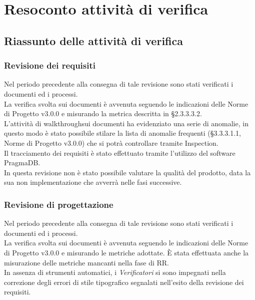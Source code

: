 \section{Resoconto attività di verifica}

\subsection{Riassunto delle attività di verifica}

	\subsubsection{Revisione dei requisiti}
	
	Nel periodo precedente alla consegna di tale revisione sono stati verificati i documenti ed i processi. \\
	La verifica svolta sui documenti è avvenuta seguendo le indicazioni delle Norme di Progetto v3.0.0 e misurando la metrica descritta in §2.3.3.3.2. \\
	L'attività di walkthrough\glosp sui documenti ha evidenziato una serie di anomalie, in questo modo è stato possibile stilare la lista di anomalie frequenti (§3.3.3.1.1, Norme di Progetto v3.0.0) che si potrà controllare tramite Inspection\glosp. \\
	Il tracciamento dei requisiti è stato effettuato tramite l'utilizzo del software PragmaDB. \\
	In questa revisione non è stato possibile valutare la qualità del prodotto, data la sua non implementazione che avverrà nelle fasi successive.
	
	\subsubsection{Revisione di progettazione}
	
	Nel periodo precedente alla consegna di tale revisione sono stati verificati i documenti ed i processi. \\
	La verifica svolta sui documenti è avvenuta seguendo le indicazioni delle Norme di Progetto v3.0.0 e misurando le metriche adottate. È stata effettuata anche la misurazione delle metriche mancanti nella fase di RR. \\
	In assenza di strumenti automatici, i \textit{Verificatori} si sono impegnati nella correzione degli errori di stile tipografico segnalati nell'esito della revisione dei requisiti.
	
